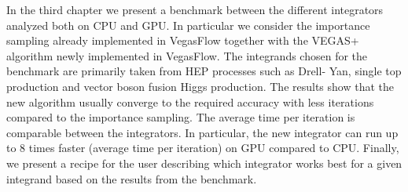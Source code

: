 \documentclass[12pt]{article}
\begin{document}
In the third chapter we present a benchmark between the different integrators analyzed both on CPU and GPU.
In particular we consider the importance sampling already implemented in VegasFlow together with the VEGAS+ algorithm newly implemented in VegasFlow.
The integrands chosen for the benchmark are primarily taken from HEP processes such as Drell- Yan, single top production and vector boson fusion Higgs production.
The results show that the new algorithm usually converge to the required accuracy with less iterations compared to the importance sampling. The average time per iteration is comparable between the integrators. In particular, the new integrator can run up to 8 times faster (average time per iteration) on GPU compared to CPU.
Finally, we present a recipe for the user describing which integrator works best for a given integrand based on the results from the benchmark.
\end{document}
